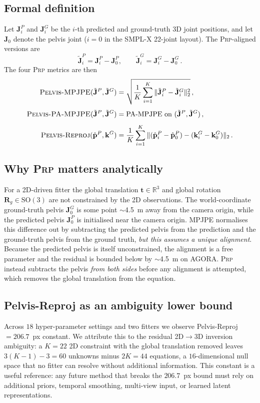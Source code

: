 \documentclass[twocolumn,10pt]{svjour3}
\newcommand{\prp}{\textsc{Prp}}
\begin{document}
\subsection{Formal definition}
Let $\mathbf{J}_i^P$ and $\mathbf{J}_i^G$ be the $i$-th predicted and ground-truth 3D joint positions, and let $\mathbf{J}_0$ denote the pelvis joint ($i=0$ in the SMPL-X 22-joint layout). The \prp{}-aligned versions are
\begin{equation}
\tilde{\mathbf{J}}_i^P = \mathbf{J}_i^P - \mathbf{J}_0^P, \qquad \tilde{\mathbf{J}}_i^G = \mathbf{J}_i^G - \mathbf{J}_0^G\,.
\label{eq:prp-align}
\end{equation}
The four \prp{} metrics are then
\begin{align}
\textsc{Pelvis-MPJPE}(\tilde{\mathbf{J}}^P, \tilde{\mathbf{J}}^G) &= \sqrt{\frac{1}{K}\sum_{i=1}^{K}\|\tilde{\mathbf{J}}_i^P - \tilde{\mathbf{J}}_i^G\|_2^2}\,, \label{eq:pelvismpjpe}\\[4pt]
\textsc{Pelvis-PA-MPJPE}(\tilde{\mathbf{J}}^P, \tilde{\mathbf{J}}^G) &= \text{PA-MPJPE on }(\tilde{\mathbf{J}}^P, \tilde{\mathbf{J}}^G)\,, \\[4pt]
\textsc{Pelvis-Reproj}(\hat{\mathbf{p}}^P, \mathbf{k}^G) &= \frac{1}{K}\sum_{i=1}^{K}\|(\hat{\mathbf{p}}_i^P - \hat{\mathbf{p}}_0^P) - (\mathbf{k}_i^G - \mathbf{k}_0^G)\|_2\,. \label{eq:pelvisreproj}
\end{align}

\subsection{Why \prp{} matters analytically}
For a 2D-driven fitter the global translation $\mathbf{t}\!\in\!\mathbb{R}^3$ and global rotation $\mathbf{R}_g\!\in\!\text{SO}(3)$ are not constrained by the 2D observations. The world-coordinate ground-truth pelvis $\mathbf{J}_0^G$ is some point $\sim$4.5~m away from the camera origin, while the predicted pelvis $\mathbf{J}_0^P$ is initialised near the camera origin. MPJPE normalises this difference out by subtracting the predicted pelvis from the prediction and the ground-truth pelvis from the ground truth, \emph{but this assumes a unique alignment}. Because the predicted pelvis is itself unconstrained, the alignment is a free parameter and the residual is bounded below by $\sim$4.5~m on AGORA. \prp{} instead subtracts the pelvis \emph{from both sides} before any alignment is attempted, which removes the global translation from the equation.

\subsection{Pelvis-Reproj as an ambiguity lower bound}
Across $18$ hyper-parameter settings and two fitters we observe Pelvis-Reproj $= 206.7$~px constant. We attribute this to the residual 2D$\rightarrow$3D inversion ambiguity: a $K=22$ 2D constraint with the global translation removed leaves $3(K-1)-3 = 60$ unknowns minus $2K = 44$ equations, a $16$-dimensional null space that no fitter can resolve without additional information. This constant is a useful reference: any future method that breaks the $206.7$~px bound must rely on additional priors, temporal smoothing, multi-view input, or learned latent representations.
\end{document}
